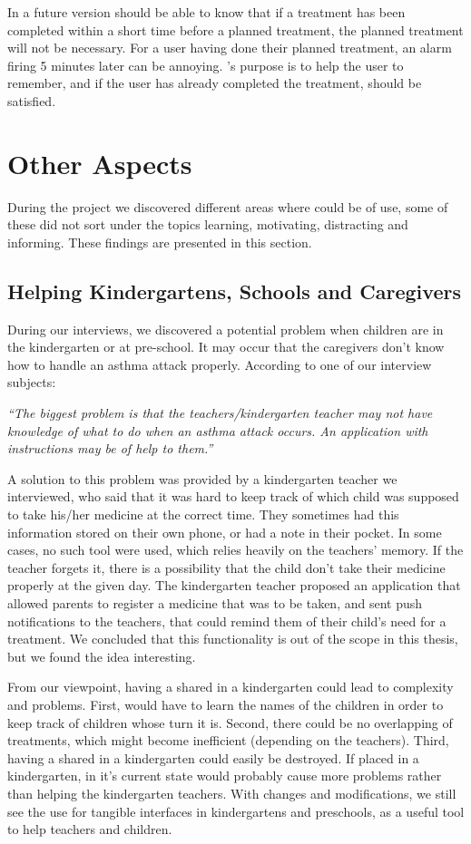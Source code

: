 In a future version \buddy{} should be able to know that if a treatment has been completed within a short time before a planned treatment, the planned treatment will not be necessary. For a user having done their planned treatment, an alarm firing 5 minutes later can be annoying. \buddy{}'s purpose is to help the user to remember, and if the user has already completed the treatment, \ab{} should be satisfied. 

\section{Other Aspects}
\label{sec:otheraspects}
During the project we discovered different areas where \ab{} could be of use, some of these did not sort under the topics learning, motivating, distracting and informing. These findings are presented in this section.

\subsection{Helping Kindergartens, Schools and Caregivers}
During our interviews, we discovered a potential problem when children are in the kindergarten or at pre-school. It may occur that the caregivers don't know how to handle an asthma attack properly. According to one of our interview subjects: 

\textit{``The biggest problem is that the teachers/kindergarten teacher may not have knowledge of what to do when an asthma attack occurs. An application with instructions may be of help to them.''}

A solution to this problem was provided by a kindergarten teacher we interviewed, who said that it was hard to keep track of which child was supposed to take his/her medicine at the correct time. They sometimes had this information stored on their own phone, or had a note in their pocket. In some cases, no such tool were used, which relies heavily on the teachers' memory. If the teacher forgets it, there is a possibility that the child don't take their medicine properly at the given day. 
The kindergarten teacher proposed an application that allowed parents to register a medicine that was to be taken, and sent push notifications to the teachers, that could remind them of their child's need for a treatment. We concluded that this functionality is out of the scope in this thesis, but we found the idea interesting.         

From our viewpoint, having a shared \buddy{} in a kindergarten could lead to complexity and problems. First, \buddy{} would have to learn the names of the children in order to keep track of children whose turn it is. Second, there could be no overlapping of treatments, which might become inefficient (depending on the teachers). Third, having a shared \buddy{} in a kindergarten could easily be destroyed. If placed in a kindergarten, \buddy{} in it's current state would probably cause more problems rather than helping the kindergarten teachers. With changes and modifications, we still see the use for tangible interfaces in kindergartens and preschools, as a useful tool to help teachers and children.    



